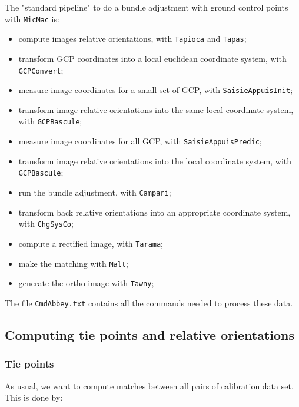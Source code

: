 \vspace{\baselineskip}
The "standard pipeline" to do a bundle adjustment with ground control points with {\tt MicMac} is:
\begin{itemize}
\item compute images relative orientations, with {\tt Tapioca} and {\tt Tapas};
\item transform GCP coordinates into a local euclidean coordinate system, with {\tt GCPConvert};
\item measure image coordinates for a small set of GCP, with {\tt SaisieAppuisInit};
\item transform image relative orientations into the same local coordinate system, with {\tt GCPBascule};
\item measure image coordinates for all GCP, with {\tt SaisieAppuisPredic};
\item transform image relative orientations into the local coordinate system, with {\tt GCPBascule};
\item run the bundle adjustment, with {\tt Campari};
\item transform back relative orientations into an appropriate coordinate system, with {\tt ChgSysCo};
\item compute a rectified image, with {\tt Tarama};
\item make the matching with {\tt Malt};
\item generate the ortho image with {\tt Tawny};
\end{itemize}

\vspace{\baselineskip}
The file {\tt CmdAbbey.txt} contains all the commands needed to process these data.



\subsection{Computing tie points and relative orientations}


\subsubsection{Tie points}

As usual, we want to compute matches between all pairs of calibration data set. This is done by:

